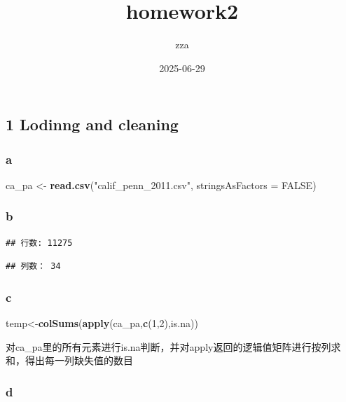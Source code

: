 \documentclass[
]{article}
\title{homework2}
\author{zza}
\date{2025-06-29}
\newenvironment{Shaded}{\begin{snugshade}}{\end{snugshade}}
\newcommand{\AttributeTok}[1]{\textcolor[rgb]{0.13,0.29,0.53}{#1}}
\newcommand{\ConstantTok}[1]{\textcolor[rgb]{0.56,0.35,0.01}{#1}}
\newcommand{\DecValTok}[1]{\textcolor[rgb]{0.00,0.00,0.81}{#1}}
\newcommand{\FunctionTok}[1]{\textcolor[rgb]{0.13,0.29,0.53}{\textbf{#1}}}
\newcommand{\NormalTok}[1]{#1}
\newcommand{\OtherTok}[1]{\textcolor[rgb]{0.56,0.35,0.01}{#1}}
\newcommand{\StringTok}[1]{\textcolor[rgb]{0.31,0.60,0.02}{#1}}
\begin{document}
\maketitle

\subsection{1 Lodinng and cleaning}\label{lodinng-and-cleaning}

\subsubsection{a}\label{a}

\begin{Shaded}
\begin{Highlighting}[]
\NormalTok{ca\_pa }\OtherTok{\textless{}{-}} \FunctionTok{read.csv}\NormalTok{(}\StringTok{"calif\_penn\_2011.csv"}\NormalTok{, }\AttributeTok{stringsAsFactors =} \ConstantTok{FALSE}\NormalTok{)}
\end{Highlighting}
\end{Shaded}

\subsubsection{b}\label{b}

\begin{verbatim}
## 行数: 11275
\end{verbatim}

\begin{verbatim}
## 列数： 34
\end{verbatim}

\subsubsection{c}\label{c}

\begin{Shaded}
\begin{Highlighting}[]
\NormalTok{temp}\OtherTok{\textless{}{-}}\FunctionTok{colSums}\NormalTok{(}\FunctionTok{apply}\NormalTok{(ca\_pa,}\FunctionTok{c}\NormalTok{(}\DecValTok{1}\NormalTok{,}\DecValTok{2}\NormalTok{),is.na))}
\end{Highlighting}
\end{Shaded}

对ca\_pa里的所有元素进行is.na判断，并对apply返回的逻辑值矩阵进行按列求和，得出每一列缺失值的数目

\subsubsection{d}\label{d}
\end{document}
